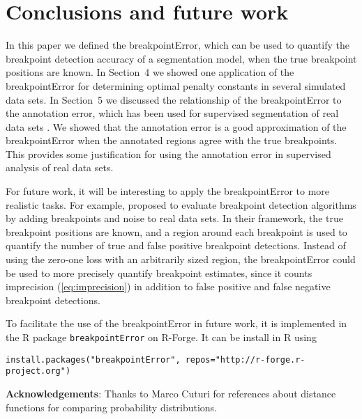 \documentclass{jsfds} %
\begin{document}
\newpage

\section{Conclusions and future work}

In this paper we defined the breakpointError, which can be used to
quantify the breakpoint detection accuracy of a segmentation model,
when the true breakpoint positions are known. In Section~4 we showed
one application of the breakpointError for determining optimal penalty
constants in several simulated data sets. In Section~5 we discussed
the relationship of the breakpointError to the annotation error, which
has been used for supervised segmentation of real data sets
\citep{HOCKING-breakpoints, HOCKING-penalties, SegAnnDB}. We showed
that the annotation error is a good approximation of the
breakpointError when the annotated regions agree with the true
breakpoints. This provides some justification for using the annotation
error in supervised analysis of real data sets.

For future work, it will be interesting to apply the breakpointError
to more realistic tasks. For example, \citet{perf-eval-framework}
proposed to evaluate breakpoint detection algorithms by adding
breakpoints and noise to real data sets. In their framework, the true
breakpoint positions are known, and a region around each breakpoint is
used to quantify the number of true and false positive breakpoint
detections. Instead of using the zero-one loss with an arbitrarily
sized region, the breakpointError could be used to more precisely
quantify breakpoint estimates, since it counts imprecision
(\ref{eq:imprecision}) in addition to false positive and false
negative breakpoint detections.

To facilitate the use of the breakpointError in future work, it is
implemented in the R package \verb|breakpointError| on R-Forge. It can
be install in R using

\begin{verbatim}
install.packages("breakpointError", repos="http://r-forge.r-project.org")
\end{verbatim}

\textbf{Acknowledgements}: Thanks to Marco Cuturi for references about
distance functions for comparing probability distributions.

%

\end{document}
